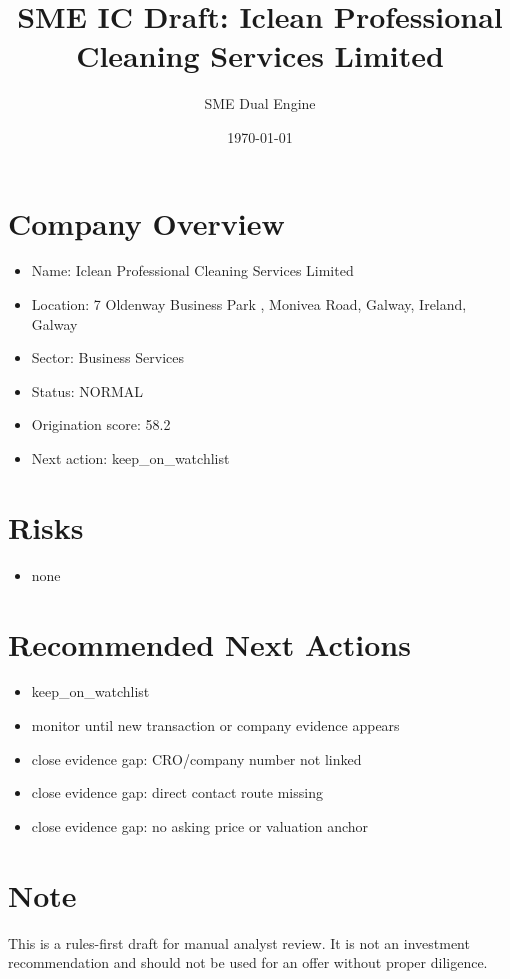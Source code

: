 \documentclass[11pt,a4paper]{article}
\title{SME IC Draft: Iclean Professional Cleaning Services Limited}
\author{SME Dual Engine}
\date{\today}
\begin{document}
\maketitle
\section*{Company Overview}
\begin{itemize}[leftmargin=1.4em]
\item Name: Iclean Professional Cleaning Services Limited
\item Location: 7 Oldenway Business Park , Monivea Road, Galway, Ireland, Galway
\item Sector: Business Services
\item Status: NORMAL
\item Origination score: 58.2
\item Next action: keep\_on\_watchlist
\end{itemize}
\section*{Risks}
\begin{itemize}[leftmargin=1.4em]
\item none
\end{itemize}
\section*{Recommended Next Actions}
\begin{itemize}[leftmargin=1.4em]
\item keep\_on\_watchlist
\item monitor until new transaction or company evidence appears
\item close evidence gap: CRO/company number not linked
\item close evidence gap: direct contact route missing
\item close evidence gap: no asking price or valuation anchor
\end{itemize}
\section*{Note}
This is a rules-first draft for manual analyst review. It is not an investment
recommendation and should not be used for an offer without proper diligence.
\end{document}
